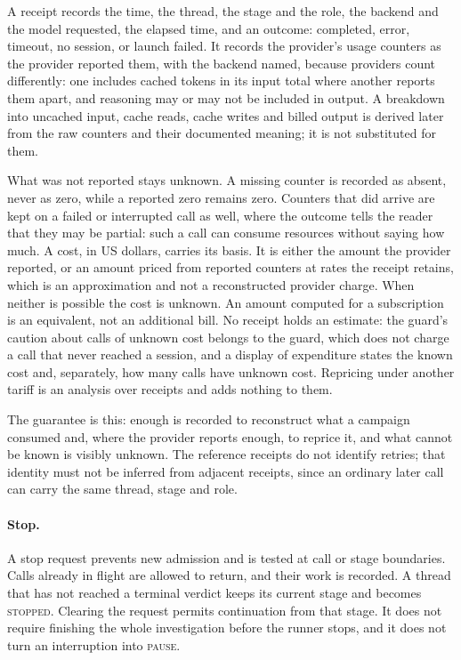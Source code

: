 \documentclass[11pt,a4paper]{article}
\newcommand{\st}[1]{\textsc{#1}}
\begin{document}
A receipt records the time, the thread, the stage and the role, the backend and
the model requested, the elapsed time, and an outcome: completed, error,
timeout, no session, or launch failed. It records the provider's usage counters
as the provider reported them, with the backend named, because providers count
differently: one includes cached tokens in its input total where another reports
them apart, and reasoning may or may not be included in output. A breakdown into
uncached input, cache reads, cache writes and billed output is derived later
from the raw counters and their documented meaning; it is not substituted for
them.

What was not reported stays unknown. A missing counter is recorded as absent,
never as zero, while a reported zero remains zero. Counters that did arrive are
kept on a failed or interrupted call as well, where the outcome tells the reader
that they may be partial: such a call can consume resources without saying how
much. A cost, in US dollars, carries its basis. It is either the amount the
provider reported, or an amount priced from reported counters at rates the
receipt retains, which is an approximation and not a reconstructed provider
charge. When neither is possible the cost is unknown. An amount computed for a
subscription is an equivalent, not an additional bill. No receipt holds an
estimate: the guard's caution about calls of unknown cost belongs to the guard,
which does not charge a call that never reached a session, and a display of expenditure states the known cost and, separately, how many
calls have unknown cost. Repricing under another tariff is an analysis over
receipts and adds nothing to them.

The guarantee is this: enough is recorded to reconstruct what a campaign
consumed and, where the provider reports enough, to reprice it, and what cannot
be known is visibly unknown. The reference receipts do not identify retries;
that identity must not be inferred from adjacent receipts, since an ordinary
later call can carry the same thread, stage and role.

\paragraph{Stop.}
A stop request prevents new admission and is tested at call or stage boundaries.
Calls already in flight are allowed to return, and their work is recorded. A
thread that has not reached a terminal verdict keeps its current stage and
becomes \st{stopped}. Clearing the request permits continuation from that stage.
It does not require finishing the whole investigation before the runner stops,
and it does not turn an interruption into \st{pause}.
\end{document}
